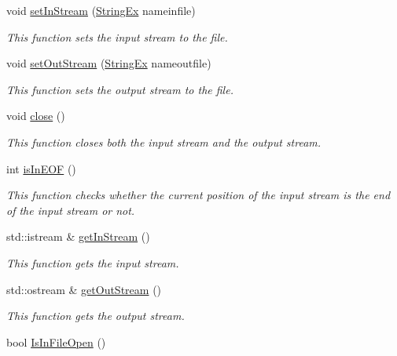 \begin{CompactItemize}
void \hyperlink{classkmaOrange_1_1StrStream_2a79107f7cdaaeafa95e6da05cbea3d1}{setInStream} (\hyperlink{classStringEx}{StringEx} nameinfile)
\begin{CompactList}\small\item\em This function sets the input stream to the file. \item\end{CompactList}\item 
void \hyperlink{classkmaOrange_1_1StrStream_afc296be71f9d177e34e658e97ec64bd}{setOutStream} (\hyperlink{classStringEx}{StringEx} nameoutfile)
\begin{CompactList}\small\item\em This function sets the output stream to the file. \item\end{CompactList}\item 
void \hyperlink{classkmaOrange_1_1StrStream_34015d2312ef738560106c753582506b}{close} ()
\begin{CompactList}\small\item\em This function closes both the input stream and the output stream. \item\end{CompactList}\item 
int \hyperlink{classkmaOrange_1_1StrStream_4a78cce030396f522ec87618e097da57}{isInEOF} ()
\begin{CompactList}\small\item\em This function checks whether the current position of the input stream is the end of the input stream or not. \item\end{CompactList}\item 
std::istream \& \hyperlink{classkmaOrange_1_1StrStream_54f1c6671fa352d232aff029810bdcd9}{getInStream} ()
\begin{CompactList}\small\item\em This function gets the input stream. \item\end{CompactList}\item 
std::ostream \& \hyperlink{classkmaOrange_1_1StrStream_c08555e223358f4758518cd678161cf2}{getOutStream} ()
\begin{CompactList}\small\item\em This function gets the output stream. \item\end{CompactList}\item 
bool \hyperlink{classkmaOrange_1_1StrStream_d34724e619d312651ab85ac9a70b4e03}{IsInFileOpen} ()

\end{CompactItemize}
